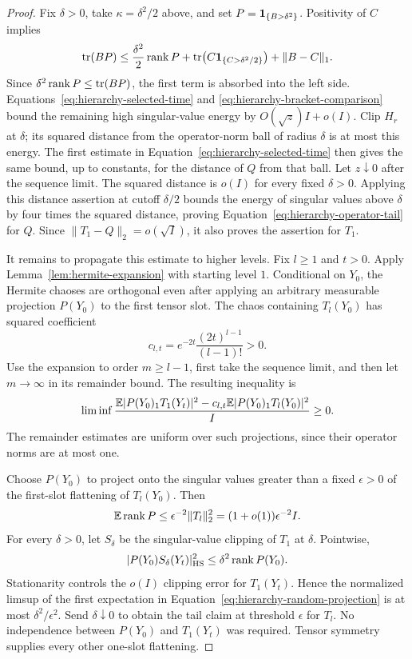 \begin{proof}
Fix $\delta>0$, take $\kappa=\delta^2/2$ above, and set
$P=\mathbf 1_{\{B>\delta^2\}}$.  Positivity of $C$ implies
\[
 \operatorname{tr}(BP)\le\frac{\delta^2}2\operatorname{rank} P
      +\operatorname{tr}\bigl(C\mathbf 1_{\{C>\delta^2/2\}}\bigr)+\|B-C\|_1.
\]
Since $\delta^2\operatorname{rank} P\le\operatorname{tr}(BP)$, the first term is absorbed into
the left side.  Equations~\eqref{eq:hierarchy-selected-time} and
\eqref{eq:hierarchy-bracket-comparison} bound the remaining high
singular-value energy by $O(\sqrt z)I+o(I)$.  Clip $H_r$ at $\delta$;
its squared distance from the operator-norm ball of radius $\delta$ is
at most this energy.  The first estimate in
Equation~\eqref{eq:hierarchy-selected-time} then gives the same bound,
up to constants, for the distance of $Q$ from that ball.  Let $z\downarrow0$
after the sequence limit.  The squared distance is $o(I)$ for every
fixed $\delta>0$.  Applying this distance assertion at cutoff
$\delta/2$ bounds the energy of singular values above $\delta$ by
four times the squared distance, proving
Equation~\eqref{eq:hierarchy-operator-tail} for $Q$.  Since
$\|T_1-Q\|_2=o(\sqrt I)$, it also proves the assertion for $T_1$.

It remains to propagate this estimate to higher levels.  Fix $l\ge1$
and $t>0$.  Apply Lemma~\ref{lem:hermite-expansion} with starting level
$1$.  Conditional on $Y_0$, the Hermite chaoses are orthogonal even
after applying an arbitrary measurable projection $P(Y_0)$ to the
first tensor slot.  The chaos containing $T_l(Y_0)$ has squared
coefficient
\[
 c_{l,t}=e^{-2t}\frac{(2t)^{l-1}}{(l-1)!}>0.
\]
Use the expansion to order $m\ge l-1$, first take the sequence limit,
and then let $m\to\infty$ in its remainder bound.  The resulting
inequality is
\begin{equation}\label{eq:hierarchy-random-projection}
 \liminf\frac{
   \mathbb E|P(Y_0)_1T_1(Y_t)|^2-c_{l,t}\mathbb E|P(Y_0)_1T_l(Y_0)|^2}{I}\ge0.
\end{equation}
The remainder estimates are uniform over such projections, since their
operator norms are at most one.

Choose $P(Y_0)$ to project onto the singular values greater than a fixed
$\epsilon>0$ of the first-slot flattening of $T_l(Y_0)$.  Then
\[
 \mathbb E\operatorname{rank} P\le\epsilon^{-2}\|T_l\|_2^2
 =(1+o(1))\epsilon^{-2}I.
\]
For every $\delta>0$, let $S_\delta$ be the singular-value clipping of
$T_1$ at $\delta$.  Pointwise,
\[
 |P(Y_0)S_\delta(Y_t)|_{\mathrm{HS}}^2
 \le\delta^2\operatorname{rank} P(Y_0).
\]
Stationarity controls the $o(I)$ clipping error for $T_1(Y_t)$.
Hence the normalized limsup of the first expectation in
Equation~\eqref{eq:hierarchy-random-projection} is at most
$\delta^2/\epsilon^2$.  Send $\delta\downarrow0$ to obtain the tail
claim at threshold $\epsilon$ for $T_l$.  No independence between
$P(Y_0)$ and $T_1(Y_t)$ was required.  Tensor symmetry supplies every
other one-slot flattening.
\end{proof}

